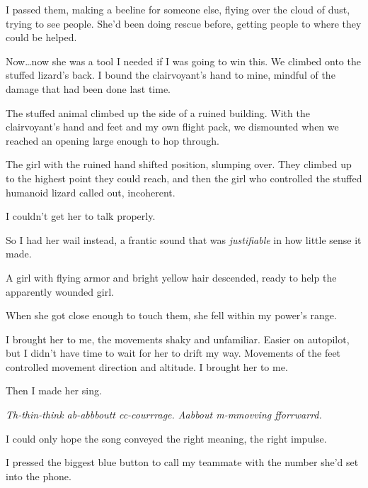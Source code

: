 I passed them, making a beeline for someone else, flying over the cloud of dust, trying to see people.  She'd been doing rescue before, getting people to where they could be helped.



Now\ldots now she was a tool I needed if I was going to win this.  We climbed onto the stuffed lizard's back.  I bound the clairvoyant's hand to mine, mindful of the damage that had been done last time.



The stuffed animal climbed up the side of a ruined building.  With the clairvoyant's hand and feet and my own flight pack, we dismounted when we reached an opening large enough to hop through.



The girl with the ruined hand shifted position, slumping over.  They climbed up to the highest point they could reach, and then the girl who controlled the stuffed humanoid lizard called out, incoherent.



I couldn't get her to talk properly.



So I had her wail instead, a frantic sound that was \emph{justifiable} in how little sense it made.



A girl with flying armor and bright yellow hair descended, ready to help the apparently wounded girl.



When she got close enough to touch them, she fell within my power's range.



I brought her to me, the movements shaky and unfamiliar.  Easier on autopilot, but I didn't have time to wait for her to drift my way.  Movements of the feet controlled movement direction and altitude.  I brought her to me.



Then I made her sing.



\emph{Th-thin-think ab-abbboutt cc-courrrage.  Aabbout m-mmovving fforrwarrd.}



I could only hope the song conveyed the right meaning, the right impulse.



I pressed the biggest blue button to call my teammate with the number she'd set into the phone.



